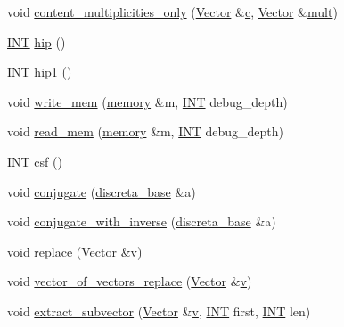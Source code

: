 \begin{DoxyCompactItemize}
void \mbox{\hyperlink{class_vector_aab0e0006bfa41b63bcffd139c85d5c5d}{content\+\_\+multiplicities\+\_\+only}} (\mbox{\hyperlink{class_vector}{Vector}} \&\mbox{\hyperlink{alphabet2_8_c_a4e1e0e72dd773439e333c84dd762a9c3}{c}}, \mbox{\hyperlink{class_vector}{Vector}} \&\mbox{\hyperlink{classdiscreta__base_a96f759b28f7c30bdfd95ac10f5972bd0}{mult}})
\item 
\mbox{\hyperlink{galois_8h_a09fddde158a3a20bd2dcadb609de11dc}{I\+NT}} \mbox{\hyperlink{class_vector_a996f4e7f37126389c883537b063d583e}{hip}} ()
\item 
\mbox{\hyperlink{galois_8h_a09fddde158a3a20bd2dcadb609de11dc}{I\+NT}} \mbox{\hyperlink{class_vector_a5ce49604a9d0d59e42e4cbad25597334}{hip1}} ()
\item 
void \mbox{\hyperlink{class_vector_a080f85e2cdd81619713fbc486d6a6fb0}{write\+\_\+mem}} (\mbox{\hyperlink{classmemory}{memory}} \&m, \mbox{\hyperlink{galois_8h_a09fddde158a3a20bd2dcadb609de11dc}{I\+NT}} debug\+\_\+depth)
\item 
void \mbox{\hyperlink{class_vector_af0ea92fb773af77ddfa068abb8dca079}{read\+\_\+mem}} (\mbox{\hyperlink{classmemory}{memory}} \&m, \mbox{\hyperlink{galois_8h_a09fddde158a3a20bd2dcadb609de11dc}{I\+NT}} debug\+\_\+depth)
\item 
\mbox{\hyperlink{galois_8h_a09fddde158a3a20bd2dcadb609de11dc}{I\+NT}} \mbox{\hyperlink{class_vector_a7bbfe1d599a93f58b2150a026a27b0f4}{csf}} ()
\item 
void \mbox{\hyperlink{class_vector_a477bb8091a6946d25d1c7b2e32c9a474}{conjugate}} (\mbox{\hyperlink{classdiscreta__base}{discreta\+\_\+base}} \&a)
\item 
void \mbox{\hyperlink{class_vector_a31e4b25f3c2939f565f2a9f215a5fd19}{conjugate\+\_\+with\+\_\+inverse}} (\mbox{\hyperlink{classdiscreta__base}{discreta\+\_\+base}} \&a)
\item 
void \mbox{\hyperlink{class_vector_aa73ce0ba837f90f7fcabf6970d8ebe8b}{replace}} (\mbox{\hyperlink{class_vector}{Vector}} \&\mbox{\hyperlink{simeon_8_c_aeb3f3030944801b163bc3b829a7f6710}{v}})
\item 
void \mbox{\hyperlink{class_vector_a01777c2c2d7c6131c6c676f679ec4cd3}{vector\+\_\+of\+\_\+vectors\+\_\+replace}} (\mbox{\hyperlink{class_vector}{Vector}} \&\mbox{\hyperlink{simeon_8_c_aeb3f3030944801b163bc3b829a7f6710}{v}})
\item 
void \mbox{\hyperlink{class_vector_a79901eec85877e4bacf1b0b6b289bdd7}{extract\+\_\+subvector}} (\mbox{\hyperlink{class_vector}{Vector}} \&\mbox{\hyperlink{simeon_8_c_aeb3f3030944801b163bc3b829a7f6710}{v}}, \mbox{\hyperlink{galois_8h_a09fddde158a3a20bd2dcadb609de11dc}{I\+NT}} first, \mbox{\hyperlink{galois_8h_a09fddde158a3a20bd2dcadb609de11dc}{I\+NT}} len)

\end{DoxyCompactItemize}
